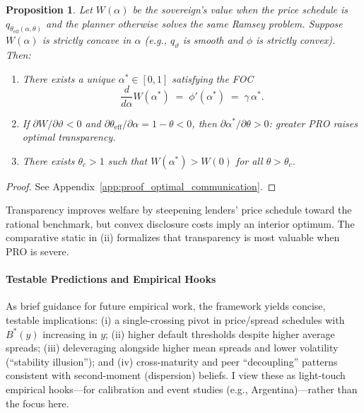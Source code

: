 \documentclass[12pt]{article}
\theoremstyle{plain}
\newtheorem{proposition}{Proposition}
\begin{document}
\begin{proposition}\label{prop:optimal_communication}
	Let $W(\alpha)$ be the sovereign's value when the price schedule is $q_{\theta_{\mathrm{eff}}(\alpha,\theta)}$ and the planner otherwise solves the same Ramsey problem. Suppose $W(\alpha)$ is strictly concave in $\alpha$ (e.g., $q_\vartheta$ is smooth and $\phi$ is strictly convex). Then:
	\begin{enumerate}
		\item[\textbf{(i)}] There exists a unique $\alpha^*\in[0,1]$ satisfying the FOC
		      \begin{equation}
			      \frac{d}{d\alpha}W(\alpha^*) \;=\; \phi'(\alpha^*) \;=\; \gamma\,\alpha^*.
			      \label{eq:foc_transparency}
		      \end{equation}
		\item[\textbf{(ii)}] If $\partial W/\partial \vartheta<0$ and $\partial \theta_{\mathrm{eff}}/\partial \alpha=1-\theta<0$, then $\partial \alpha^*/\partial \theta>0$: greater PRO raises optimal transparency.
		\item[\textbf{(iii)}] There exists $\theta_c>1$ such that $W(\alpha^*)>W(0)$ for all $\theta>\theta_c$.
	\end{enumerate}
\end{proposition}

\begin{proof}
	See Appendix~\ref{app:proof_optimal_communication}.
\end{proof}

Transparency improves welfare by steepening lenders' price schedule toward the
rational benchmark, but convex disclosure costs imply an interior optimum. The
comparative static in (ii) formalizes that transparency is most valuable when
PRO is severe.

\paragraph{Testable Predictions and Empirical Hooks}
As brief guidance for future empirical work, the framework yields concise,
testable implications: (i) a single-crossing pivot in price/spread schedules
with $B^*(y)$ increasing in $y$; (ii) higher default thresholds despite higher
average spreads; (iii) deleveraging alongside higher mean spreads and lower
volatility (``stability illusion''); and (iv) cross-maturity and peer
``decoupling'' patterns consistent with second-moment (dispersion) beliefs. I
view these as light-touch empirical hooks—for calibration and event studies
(e.g., Argentina)—rather than the focus here.
\end{document}
